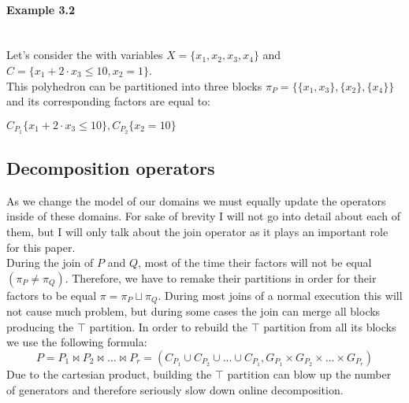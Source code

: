  
\paragraph{Example 3.2} \mbox{}\\
Let's consider the with variables $X = \{x_1,x_2,x_3,x_4\}$ and $C = \{ x_1 + 2 \cdot x_3 \leq 10, x_2 = 1 \}$.\\
This polyhedron can be partitioned into three blocks $\pi_P = \{\{x_1,x_3\},\{x_2\},\{x_4\}\}$ and its corresponding factors are equal to:
\begin{center}
	$C_{P_1}\{x_1 + 2\cdot x_3 \leq 10 \} , C_{P_2}\{x_2 = 10 \}$
\end{center}


\subsection{Decomposition operators}
As we change the model of our domains we must equally update the operators inside of these domains. For sake of brevity I will not go into detail about each of them, but I will only talk about the join operator as it plays an important role for this paper.\\
During the join of $P$ and $Q$, most of the time their factors will not be equal$(\pi_P \neq \pi_Q)$. Therefore, we have to remake their partitions in order for their factors to be equal $\pi = \pi_P\sqcup\pi_Q$. During most joins of a normal execution this will not cause much problem, but during some cases the join can merge all blocks producing the $\top$ partition. In order to rebuild the $\top$ partition from all its blocks we use the following formula:
\begin{equation}
	P = P_1 \Join P_2 \Join ... \Join P_r = (C_{P_1} \cup C_{P_2} \cup ... \cup C_{P_1}, G_{P_1} \times G_{P_2} \times  ... \times   G_{P_r})
\end{equation}
Due to the cartesian product, building the $\top$ partition can blow up the number of generators and therefore seriously slow down online decomposition.


